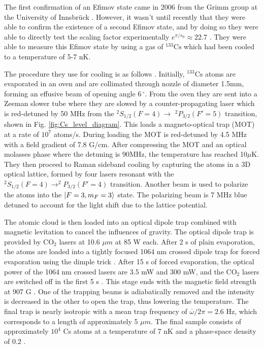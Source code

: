 \documentclass[prl,onecolumn,amsmath,amssymb,titlepage,nofootinbib,preprint]{revtex4-1}
\begin{document}
	 The first confirmation of an Efimov state came in 2006 from the Grimm group at the University of Innsbr\"{u}ck \cite{Kraemer2006_1st_observ}.  However, it wasn't until recently that they were able to confirm the existence of a second Efimov state, and by doing so they were able to directly test the scaling factor experimentally $e^{\pi/s_{0}}\approx22.7$ \cite{Huang2014}.  They were able to measure this Efimov state by using a gas of $^{133}\text{Cs}$ which had been cooled to a temperature of 5-7 nK.
	 
	 The procedure they use for cooling is as follows \cite{Berninger2011} \cite{Herbig2005}.  Initially, $^{133}\text{Cs}$ atoms are evaporated in an oven and are collimated through nozzle of diameter 1.5mm, forming an effusive beam of opening angle $6\,^{\circ}$.  From the oven they are sent into a Zeeman slower tube where they are slowed by a counter-propagating laser which is red-detuned by 50 MHz from the $^{2}S_{1/2}(F=4)\rightarrow$ $^{2}P_{3/2}(F'=5)$ transition, shown in Fig. \ref{fig:Cs_level_diagram}. This loads a magneto-optical trap (MOT) at a rate of $10^{7}$ atoms/s.  During loading the MOT is red-detuned by 4.5 MHz with a field gradient of 7.8 G/cm.  After compressing the MOT and an optical molasses phase where the detuning is 90MHz, the temperature has reached 10$\mu\text{K}$.  They then proceed to Raman sideband cooling by capturing the atoms in a 3D optical lattice, formed by four lasers resonant with the $^{2}S_{1/2}(F=4)\rightarrow ^{2}P_{3/2}(F'=4)$ transition.  Another beam is used to polarize the atoms into the $\ket{F=3,m_{F}=3}$ state. The polarizing beam is 7 MHz blue detuned to account for the light shift due to the lattice potential.
	 
	 The atomic cloud is then loaded into an optical dipole trap combined with magnetic levitation to cancel the influences of gravity.  The optical dipole trap is provided by $\text{CO}_{2}$ lasers at 10.6 $\mu m$ at 85 W each.  After 2 s of plain evaporation, the atoms are loaded into a tightly focused 1064 nm crossed dipole trap for forced evaporation using the dimple trick \cite{Kraemer2004}.  After 15 s of forced evaporation, the optical power of the 1064 nm crossed lasers are 3.5 mW and 300 mW, and the $\text{CO}_{2}$ lasers are switched off in the first 5 s \cite{Berninger2011}.  This stage ends with the magnetic field strength at 907 G \cite{Huang2014}. One of the trapping beams is adiabatically removed and the intensity is decreased in the other to open the trap, thus lowering the temperature. The final trap is nearly isotropic with a mean trap frequency of $\overline{\omega}/2\pi=2.6$ Hz, which corresponds to a length of approximately 5 $\mu m$.  The final sample consists of approximately $10^{4}$ Cs atoms at a temperature of 7 nK and a phase-space density of 0.2 \cite{Huang2014}.
	 
\end{document}
